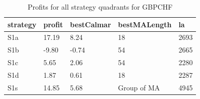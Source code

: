 \documentclass{tewiart}
\begin{document}
\newpage
\begin{table}[!t]
\caption{Profits for all strategy quadrants for GBPCHF}
 \begin{center}
 \begin{tabular}{|l|l|l|l|l|}
 \hline \textbf{strategy} & \textbf{profit} & \textbf{bestCalmar} & \textbf{bestMALength} & \textbf{la} \\ \hline
S1a & 17.19 & 8.24 & 18 & 2693\\ \hline
S1b & -9.80 & -0.74 & 54 & 2665\\ \hline
S1c & 5.65 & 2.06 & 54 & 2280\\ \hline
S1d & 1.87 & 0.61 & 18 & 2287\\ \hline
S1s & 14.85 & 5.68 & Group of MA & 4945\\
\hline \end{tabular}
 \end{center}
 \end{table}
\FloatBarrier
\end{document}

